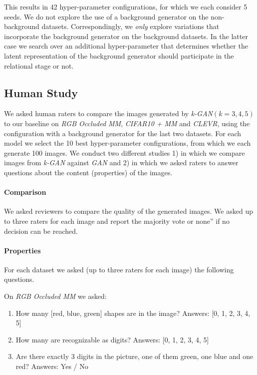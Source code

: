 \documentclass{article}
\begin{document}
This results in 42 hyper-parameter configurations, for which we each consider 5 seeds.
We do not explore the use of a background generator on the non-background datasets.
Correspondingly, we \emph{only} explore variations that incorporate the background generator on the background datasets.
In the latter case we search over an additional hyper-parameter that determines whether the latent representation of the background generator should participate in the relational stage or not.

\subsection{Human Study}

We asked human raters to compare the images generated by \emph{k-GAN}$(k=3,4,5)$ to our baseline on \emph{RGB Occluded MM}, \emph{CIFAR10 + MM} and \emph{CLEVR}, using the configuration with a background generator for the last two datasets.
For each model we select the 10 best hyper-parameter configurations, from which we each generate 100 images.
We conduct two different studies 1) in which we compare images from \emph{k-GAN} against \emph{GAN} and 2) in which we asked raters to answer questions about the content (properties) of the images.

\paragraph{Comparison}
We asked reviewers to compare the quality of the generated images.
We asked up to three raters for each image and report the majority vote or none” if no decision can be reached.

\paragraph{Properties}
For each dataset we asked (up to three raters for each image) the following questions.

On \emph{RGB Occluded MM} we asked:
\begin{enumerate}
\item How many [red, blue, green] shapes are in the image? Answers: [0, 1, 2, 3, 4, 5]
\item How many are recognizable as digits? Answers: [0, 1, 2, 3, 4, 5]
\item Are there exactly 3 digits in the picture, one of them green, one blue and one red? Answers: Yes / No
\end{enumerate}
\end{document}
